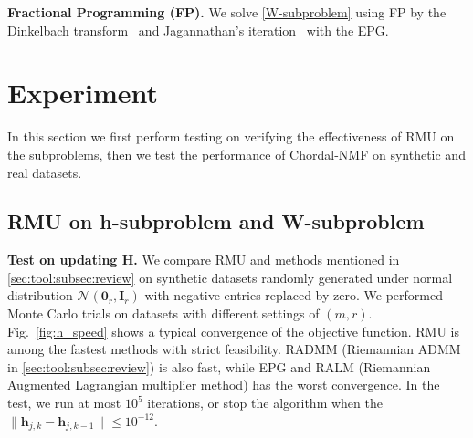 \documentclass[sn-mathphys-num]{sn-jnl}
\def\zeros           {\bm{0}}            %
\def\I {\bm{I}}
\def\h {\bm{h}}
\def\cN { \mathcal{N}}
\begin{document}
\noindent\textbf{Fractional Programming (FP).}\label{par:fracprog}
We solve \eqref{W-subproblem} using FP by the Dinkelbach transform~\cite{dinkelbach1967nonlinear} and Jagannathan's iteration~\cite{jagannathan1966some} with the EPG.








\section{Experiment}\label{sec:Exp}
In this section we first perform testing on verifying the effectiveness of RMU on the subproblems, then we test the performance of Chordal-NMF on synthetic and real datasets.

\subsection{RMU on h-subproblem and W-subproblem}

\noindent\textbf{Test on updating H.}
We compare RMU and methods mentioned in \textsection\ref{sec:tool:subsec:review} on synthetic datasets randomly generated under normal distribution $\cN(\zeros_r, \I_r)$ with negative entries replaced by zero.
We performed Monte Carlo trials on datasets with different settings of $(m,r)$.
Fig.~\ref{fig:h_speed} shows a typical convergence of the objective function. 
RMU is among the fastest methods with strict feasibility. 
RADMM (Riemannian ADMM in \textsection\ref{sec:tool:subsec:review}) is also fast, while EPG and RALM (Riemannian Augmented Lagrangian multiplier method) has the worst convergence.
In the test, we run at most $10^{5}$ iterations, or stop the algorithm when the $\|\h_{j,k}-\h_{j,k-1}\| \leq 10^{-12}$.
\end{document}
